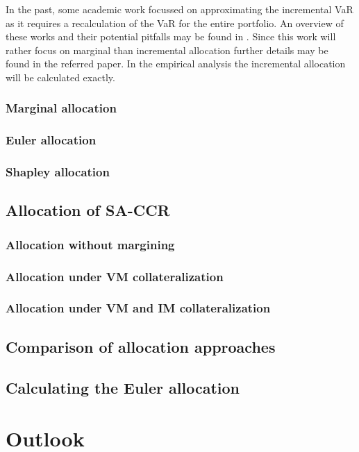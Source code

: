 \documentclass[12pt,a4paper]{article}
\begin{document}
In the past, some academic work focussed on approximating the incremental VaR as it requires a recalculation of the VaR for the entire portfolio. An overview of these works and their potential pitfalls may be found in \cite{tibiletti2001incremental}. Since this work will rather focus on marginal than incremental allocation further details may be found in the referred paper. In the empirical analysis the incremental allocation will be calculated exactly.

\subsubsection{Marginal allocation}

\subsubsection{Euler allocation}

\subsubsection{Shapley allocation}

\subsection{Allocation of SA-CCR}

\subsubsection{Allocation without margining}

\subsubsection{Allocation under VM collateralization}

\subsubsection{Allocation under VM and IM collateralization}

\subsection{Comparison of allocation approaches}

\subsection{Calculating the Euler allocation}

\section{Outlook}

\newpage
{} \nocite{*} %


\newpage
\begin{appendix}
\end{appendix}
\newpage \thispagestyle{empty}
\end{document}

